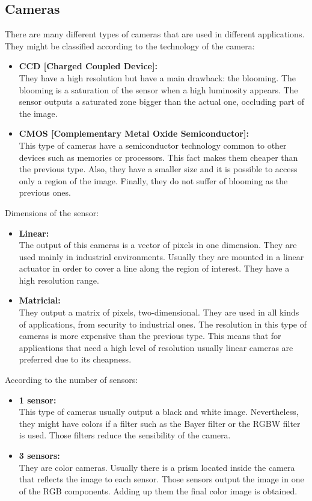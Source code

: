\subsection{Cameras}
\label{cameras}
There are many different types of cameras that are used in different applications. 
They might be classified according to the technology of the camera: 
\begin{itemize}
	\item\textbf{{CCD [Charged Coupled Device]:}}\\
	They have a high resolution but have a main drawback: the blooming. 
	The blooming is a saturation of the sensor when a high luminosity appears. 
	The sensor outputs a saturated zone bigger than the actual one, occluding part of the image. 
	\item\textbf{{CMOS [Complementary Metal Oxide Semiconductor]:}}\\
	This type of cameras have a semiconductor technology common to other devices such as memories or processors. 
	This fact makes them cheaper than the previous type. 
	Also, they have a smaller size and it is possible to access only a region of the image. 
	Finally, they do not suffer of blooming as the previous ones. 
\end{itemize}

Dimensions of the sensor: 
\begin{itemize}
	\item\textbf{{Linear:}}\\
	The output of this cameras is a vector of pixels in one dimension. 
	They are used mainly in industrial environments.
	Usually they are mounted in a linear actuator in order to cover a line along the region of interest. 
	They have a high resolution range. 
	\item\textbf{{Matricial:}}\\
	They output a matrix of pixels, two-dimensional. 
	They are used in all kinds of applications, from security to industrial ones. 
	The resolution in this type of cameras is more expensive than the previous type. 
	This means that for applications that need a high level of resolution usually linear cameras are preferred due to its cheapness. 
\end{itemize}


According to the number of sensors: 
\begin{itemize}
	\item\textbf{{1 sensor:}}\\
	This type of cameras usually output a black and white image. 
	Nevertheless, they might have colors if a filter such as the Bayer filter or the RGBW filter is used. 
	Those filters reduce the sensibility of the camera. 
	\item\textbf{{3 sensors: }}\\
	They are color cameras. 
	Usually there is a prism located inside the camera that reflects the image to each sensor. 
	Those sensors output the image in one of the RGB components. 
	Adding up them the final color image is obtained. 
\end{itemize}


